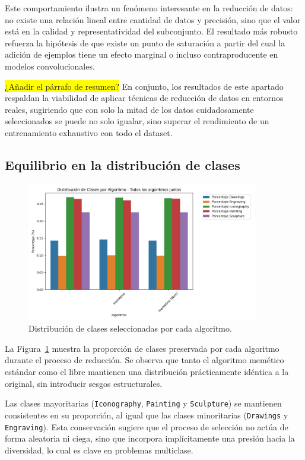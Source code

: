 Este comportamiento ilustra un fenómeno interesante en la reducción de datos: no existe una relación lineal entre cantidad de datos y precisión,
sino que el valor está en la calidad y representatividad del subconjunto.
El resultado más robusto refuerza la hipótesis de que existe un punto de saturación
a partir del cual la adición de ejemplos tiene un efecto marginal o incluso contraproducente en modelos convolucionales.

\colorbox{yellow}{¿Añadir el párrafo de resumen?}
En conjunto, los resultados de este apartado respaldan la viabilidad de aplicar técnicas de reducción de datos en entornos reales,
sugiriendo que con solo la mitad de los datos cuidadosamente seleccionados se puede no solo igualar,
sino superar el rendimiento de un entrenamiento exhaustivo con todo el dataset.

\subsection{Equilibrio en la distribución de clases}
\begin{figure}[h]
    \centering
    \includegraphics[width=0.9\textwidth]{imagenes/evaluaciones/painting/balance-de-clases-por-algoritmo}
    \caption{Distribución de clases seleccionadas por cada algoritmo.}
    \label{fig:balance_clases_painting}
\end{figure}

La Figura~\ref{fig:balance_clases_painting} muestra la proporción de clases preservada por cada algoritmo durante el proceso de reducción.
Se observa que tanto el algoritmo memético estándar como el libre mantienen una distribución prácticamente idéntica a la original,
sin introducir sesgos estructurales.

Las clases mayoritarias (\texttt{Iconography}, \texttt{Painting} y \texttt{Sculpture}) se mantienen consistentes en su proporción,
al igual que las clases minoritarias (\texttt{Drawings} y \texttt{Engraving}).
Esta conservación sugiere que el proceso de selección no actúa de forma aleatoria ni ciega,
sino que incorpora implícitamente una presión hacia la diversidad, lo cual es clave en problemas multiclase.

